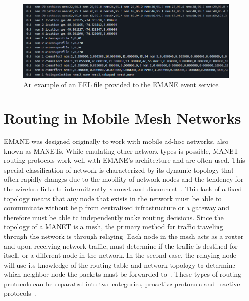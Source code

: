 \begin{figure}[!ht]
    \centering
    \includegraphics[width=\textwidth,keepaspectratio]{Images/Chpt2/emane_event.png}
    \caption{An example of an EEL file provided to the EMANE event service.}
    \label{emane_event}
\end{figure}

\section{Routing in Mobile Mesh Networks}
EMANE was designed originally to work with mobile ad-hoc networks, also known as MANETs.
While emulating other network types is possible, MANET routing protocols work well with EMANE's architecture and are often used.
This special classification of network is characterized by its dynamic topology that often rapidly changes due to the mobility of network nodes and the tendency for the wireless links to intermittently connect and disconnect~\cite{manet_storm}.
This lack of a fixed topology means that any node that exists in the network must be able to communicate without help from centralized infrastructure or a gateway and therefore must be able to independently make routing decisions. 
Since the topology of a MANET is a mesh, the primary method for traffic traveling through the network is through relaying.
Each node in the mesh acts as a router and upon receiving network traffic, must determine if the traffic is destined for itself, or a different node in the network.
In the second case, the relaying node will use its knowledge of the routing table and network topology to determine which neighbor node the packets must be forwarded to~\cite{manet_survey}.
These types of routing protocols can be separated into two categories, proactive protocols and reactive protocols~\cite{manet_survey}.

